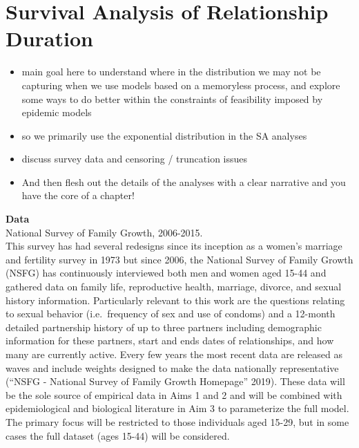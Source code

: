 \documentclass [11pt, proquest] {uwthesis}[2015/03/03]
\providecommand{\tightlist}{%
  \setlength{\itemsep}{0pt}\setlength{\parskip}{0pt}}
\begin{document}
\chapter{Survival Analysis of Relationship Duration}\label{surv}
\begin{itemize}
\tightlist
\item
  main goal here to understand where in the distribution we may not be
  capturing when we use models based on a memoryless process, and
  explore some ways to do better within the constraints of feasibility
  imposed by epidemic models
\item
  so we primarily use the exponential distribution in the SA analyses
\item
  discuss survey data and censoring / truncation issues
\item
  And then flesh out the details of the analyses with a clear narrative
  and you have the core of a chapter!
\end{itemize}
\textbf{Data}\\
National Survey of Family Growth, 2006-2015.\\
This survey has had several redesigns since its inception as a women's
marriage and fertility survey in 1973 but since 2006, the National
Survey of Family Growth (NSFG) has continuously interviewed both men and
women aged 15-44 and gathered data on family life, reproductive health,
marriage, divorce, and sexual history information. Particularly relevant
to this work are the questions relating to sexual behavior
(i.e.~frequency of sex and use of condoms) and a 12-month detailed
partnership history of up to three partners including demographic
information for these partners, start and ends dates of relationships,
and how many are currently active. Every few years the most recent data
are released as waves and include weights designed to make the data
nationally representative (``NSFG - National Survey of Family Growth
Homepage'' 2019). These data will be the sole source of empirical data
in Aims 1 and 2 and will be combined with epidemiological and biological
literature in Aim 3 to parameterize the full model. The primary focus
will be restricted to those individuals aged 15-29, but in some cases
the full dataset (ages 15-44) will be considered.
\end{document}

